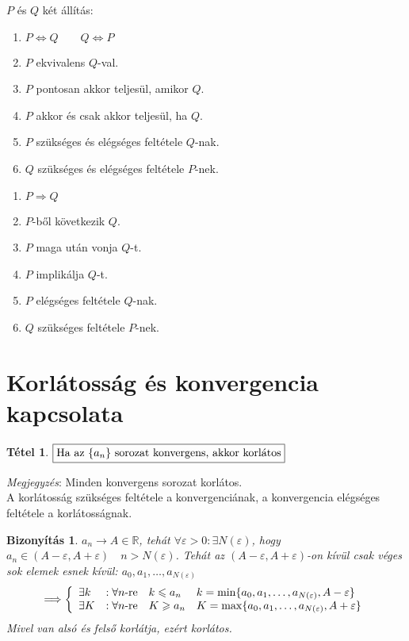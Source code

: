 \documentclass[a4paper,12pt,twoside]{book}
\newtheorem{tetel}{Tétel}[chapter]
\theoremstyle{break}
\newtheorem{bizNL}[biz]{Bizonyítás}
\theoremstyle{plain}
\begin{document}
$P$ és $Q$ két állítás:
\begin{enumerate}
 \setlength{\itemsep}{1pt}
 \setlength{\parskip}{0pt}
 \setlength{\parsep}{0pt}

 \item $P \Leftrightarrow Q \qquad Q \Leftrightarrow P$
 \item $P$ ekvivalens $Q$-val.
 \item $P$ pontosan akkor teljesül, amikor $Q$.
 \item $P$ akkor és csak akkor teljesül, ha $Q$.
 \item $P$ szükséges és elégséges feltétele $Q$-nak.
 \item $Q$ szükséges és elégséges feltétele $P$-nek.
\end{enumerate}

\begin{enumerate}
 \setlength{\itemsep}{1pt}
 \setlength{\parskip}{0pt}
 \setlength{\parsep}{0pt}

 \item $P \Rightarrow Q$
 \item $P$-ből következik $Q$.
 \item $P$ maga után vonja $Q$-t.
 \item $P$ implikálja $Q$-t.
 \item $P$ elégséges feltétele $Q$-nak.
 \item $Q$ szükséges feltétele $P$-nek.
\end{enumerate}

\section{Korlátosság és konvergencia kapcsolata}

\begin{tetel}$\boxed{$Ha az $\{a_n\}$ sorozat konvergens, akkor korlátos$}$\end{tetel}
\textit{Megjegyzés}: Minden konvergens sorozat korlátos.\\
A korlátosság szükséges feltétele a konvergenciának, a konvergencia elégséges feltétele a korlátos\-ságnak.
\begin{bizNL}
$a_n\to A\in\mathbb{R}$, tehát $\forall\varepsilon>0: \exists N(\varepsilon)$, hogy $a_n\in(A-\varepsilon,A+\varepsilon) \quad n>N(\varepsilon)$. Tehát az $(A-\varepsilon,A+\varepsilon)$-on kívül csak véges sok elemek esnek kívül: $a_0, a_1, \ldots, a_{N(\varepsilon)}$
\[\Longrightarrow \left\{\begin{array}{llll}
  \exists k & : \forall n\hbox{-re} & k\leqslant a_n & k = \min\{a_0, a_1, \ldots, a_{N(\varepsilon)}, A-\varepsilon\}\\
  \exists K & : \forall n\hbox{-re} & K\geqslant a_n & K = \max\{a_0, a_1, \ldots, a_{N(\varepsilon)}, A+\varepsilon\}\\
\end{array}\right.\]
Mivel van alsó és felső korlátja, ezért korlátos.
\end{bizNL}
\end{document}
